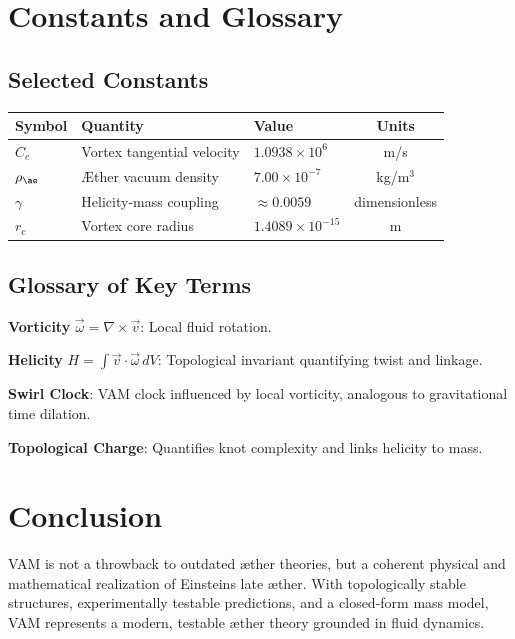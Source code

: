 \documentclass[12pt]{article}
\begin{document}
    \section{Constants and Glossary}
    \subsection{Selected Constants}
    \begin{tabular}{lllc}
        \toprule
        Symbol & Quantity & Value & Units \\
        \midrule
        $C_e$ & Vortex tangential velocity & $1.0938 \times 10^6$ & m/s \\
        $\rho_{\ae}$ & Æther vacuum density & $7.00 \times 10^{-7}$ & kg/m$^3$ \\
        $\gamma$ & Helicity-mass coupling & $\approx 0.0059$ & dimensionless \\
        $r_c$ & Vortex core radius & $1.4089 \times 10^{-15}$ & m \\
        \bottomrule
    \end{tabular}

    \subsection{Glossary of Key Terms}
    \textbf{Vorticity} \(\vec{\omega} = \nabla \times \vec{v}\): Local fluid rotation.

    \textbf{Helicity} \(H = \int \vec{v} \cdot \vec{\omega} \, dV\): Topological invariant quantifying twist and linkage.

    \textbf{Swirl Clock}: VAM clock influenced by local vorticity, analogous to gravitational time dilation.

    \textbf{Topological Charge}: Quantifies knot complexity and links helicity to mass.

    \section{Conclusion}
    VAM is not a throwback to outdated æther theories, but a coherent physical and mathematical realization of Einstein\rqs s late æther. With topologically stable structures, experimentally testable predictions, and a closed-form mass model, VAM represents a modern, testable æther theory grounded in fluid dynamics.
\end{document}
